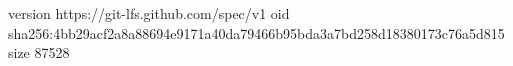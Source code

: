 version https://git-lfs.github.com/spec/v1
oid sha256:4bb29acf2a8a88694e9171a40da79466b95bda3a7bd258d18380173c76a5d815
size 87528

